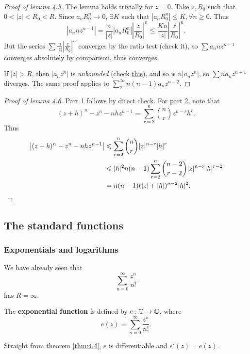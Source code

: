 \begin{proof}[Proof of lemma 4.5]
    The lemma holds trivially for $z=0$.
    Take $z,R_0$ such that $ 0<|z|<R_0<R $. Since $ a_nR_0^n\to 0 $, $ \exists K $ such that $ |a_n R_0^n|\le K, \forall n\ge 0 $. Thus 
    \[
        \left| a_n n z^{n-1} \right| = \frac{n}{|z|} \left| a_n R_0^n \right| \left| \frac{z}{R_0} \right|^n \le \frac{Kn}{|z|}\left| \frac{z}{R_0} \right|^n.
    \]
    But the series $\sum \frac{n}{|z|}| \frac{z}{R_0} |^n$ converges by the ratio test (check it), so $ \sum a_n n z^{n-1} $ converges absolutely by comparison, thus converges.

    If $ |z|>R $, then $ |a_nz^n| $ is \textit{unbounded} (check \href{https://math.stackexchange.com/questions/799481/absolute-sequence-unbounded-within-radius-of-convergence}{this}), and so is $ n|a_nz^n| $, so $ \sum na_n z^{n-1} $ diverges. The same proof applies to $\sum_{2}^\infty n(n-1)a_n z^{n-2}$.
\end{proof}
\begin{proof}[Proof of lemma 4.6]
    Part 1 follows by direct check. For part 2, note that
    \[
        (z+h)^n-z^n-nhz^{n-1} = \sum_{r=2}^{n}\binom{n}{r} z^{n-r}h^r.
    \] 
    Thus 
    \begin{align*}
        \left| (z+h)^n-z^n-nhz^{n-1} \right| &\le \sum_{r=2}^{n}\binom{n}{r} |z|^{n-r}|h|^r \\ 
        &\le |h|^2 n(n-1) \sum_{r=2}^{n}\binom{n-2}{r-2}|z|^{n-r}|h|^{r-2}\\
        &= n(n-1)(|z|+|h|)^{n-2}|h|^2. \qedhere
    \end{align*}
\end{proof}

\subsection{The standard functions}
\subsubsection*{Exponentials and logarithms}
We have already seen that 
\[
    \sum_{n=0}^{\infty} \frac{z^n}{n!}
\]
has $ R=\infty $.
\begin{definition}
    The \textbf{exponential function} is defined by $ e:\bbC\to\bbC $, where
    \[
        e(z) = \sum_{n=0}^{\infty} \frac{z^n}{n!}.
    \]
\end{definition}
Straight from theorem \ref{thm:4.4}, $ e $ is differentiable and $ e'(z)=e(z) $.

